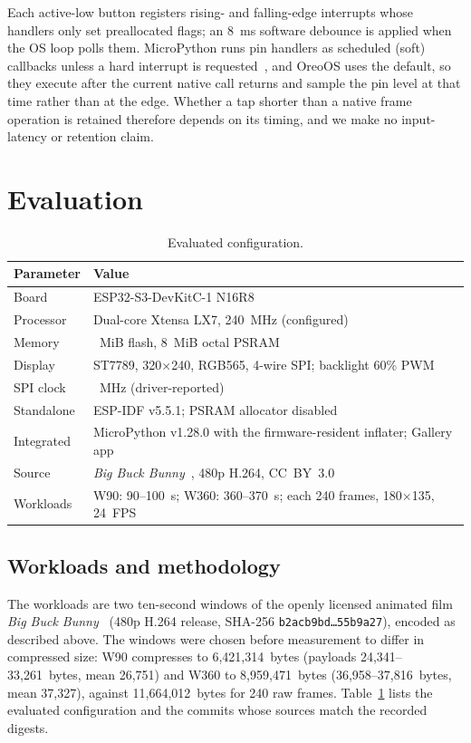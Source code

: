 \documentclass[11pt,twocolumn]{article}
\begin{document}
Each active-low button registers rising- and falling-edge interrupts whose
handlers only set preallocated flags; an 8~ms software debounce is applied
when the OS loop polls them.  MicroPython runs pin handlers as scheduled
(soft) callbacks unless a hard interrupt is requested~\cite{micropython2026pin},
and OreoOS uses the default, so they execute after the current native call
returns and sample the pin level at that time rather than at the edge.
Whether a tap shorter than a native frame operation is retained therefore
depends on its timing, and we make no input-latency or retention claim.

\section{Evaluation}
\label{sec:evaluation}

\begin{table}[t]
\centering
\caption{Evaluated configuration.}
\label{tab:platform}
\begin{tabular}{@{}>{\raggedright\arraybackslash}p{}%
                >{\raggedright\arraybackslash}p{}@{}}
\toprule
Parameter & Value \\
\midrule
Board & ESP32-S3-DevKitC-1 N16R8 \\
Processor & Dual-core Xtensa LX7, 240~MHz (configured) \\
Memory & 16~MiB flash, 8~MiB octal PSRAM \\
Display & ST7789, 320$\times$240, RGB565, 4-wire SPI; backlight 60\% PWM \\
SPI clock & 40~MHz (driver-reported) \\
Standalone & ESP-IDF v5.5.1; PSRAM allocator disabled \\
Integrated & MicroPython v1.28.0 with the firmware-resident inflater; Gallery app \\
Source & \emph{Big Buck Bunny}~\cite{blender2008bbb}, 480p H.264, CC~BY~3.0 \\
Workloads & W90: 90--100~s; W360: 360--370~s; each 240 frames, 180$\times$135, 24~FPS \\
\bottomrule
\end{tabular}
\end{table}

\subsection{Workloads and methodology}

The workloads are two ten-second windows of the openly licensed animated film
\emph{Big Buck Bunny}~\cite{blender2008bbb} (480p H.264 release, SHA-256
\texttt{b2acb9bd\ldots 55b9a27}), encoded as described above.  The windows were
chosen before measurement to differ in compressed size: W90 compresses to
6,421,314~bytes (payloads 24,341--33,261~bytes, mean 26,751) and W360 to
8,959,471~bytes (36,958--37,816~bytes, mean 37,327), against 11,664,012~bytes
for 240 raw frames.  Table~\ref{tab:platform} lists the evaluated configuration
and the commits whose sources match the recorded digests.
\end{document}
